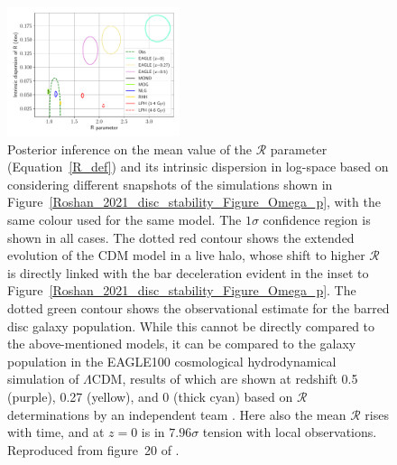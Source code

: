 \documentclass[fleqn,usenatbib,useAMS]{mnras} %
\begin{document}
\begin{figure}
	\centering
	\includegraphics[width=0.45\textwidth]{Roshan_2021_disc_stability_Figure_20}
	\caption{Posterior inference on the mean value of the $\mathcal{R}$ parameter (Equation~\ref{R_def}) and its intrinsic dispersion in log-space based on considering different snapshots of the simulations shown in Figure~\ref{Roshan_2021_disc_stability_Figure_Omega_p}, with the same colour used for the same model. The $1\sigma$ confidence region is shown in all cases. The dotted red contour shows the extended evolution of the CDM model in a live halo, whose shift to higher $\mathcal{R}$ is directly linked with the bar deceleration evident in the inset to Figure~\ref{Roshan_2021_disc_stability_Figure_Omega_p}. The dotted green contour shows the observational estimate for the barred disc galaxy population. While this cannot be directly compared to the above-mentioned models, it can be compared to the galaxy population in the EAGLE100 cosmological hydrodynamical simulation of $\Lambda$CDM, results of which are shown at redshift 0.5 (purple), 0.27 (yellow), and 0 (thick cyan) based on $\mathcal{R}$ determinations by an independent team \citep{Algorry_2017}. Here also the mean $\mathcal{R}$ rises with time, and at $z = 0$ is in $7.96\sigma$ tension with local observations. Reproduced from figure~20 of \citet{Roshan_2021_disc_stability}.}
	\label{Roshan_2021_disc_stability_Figure_R}
\end{figure}
\end{document}
